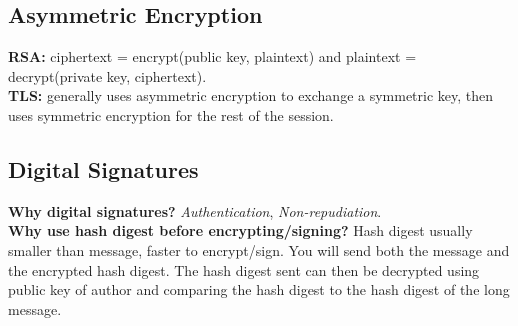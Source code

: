 \subsection{Asymmetric Encryption}
\textbf{RSA:} ciphertext = encrypt(public key, plaintext) and plaintext = decrypt(private key, ciphertext).\\
\textbf{TLS:} generally uses asymmetric encryption to exchange a symmetric key, then uses symmetric encryption for the rest of the session.\\

\subsection{Digital Signatures}
\textbf{Why digital signatures?} \textit{Authentication}, \textit{Non-repudiation}.\\
\textbf{Why use hash digest before encrypting/signing?} Hash digest usually smaller than message, faster to encrypt/sign. You will send both the message and the encrypted hash digest. The hash digest sent can then be decrypted using public key of author and comparing the hash digest to the hash digest of the long message.\\
